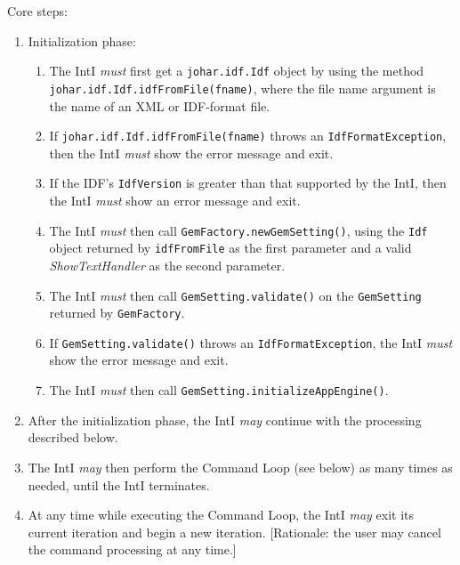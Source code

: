 \documentclass[11pt]{article}
\newcommand{\must}{{\it must}}
\newcommand{\may}{{\it may}}
\newcounter{coreReq}
\begin{document}
\noindent
Core steps:
\begin{enumerate}
\setcounter{enumi}{\value{coreReq}}
\item Initialization phase:
  \begin{enumerate}
  \item The IntI {\must} first get a {\tt johar.idf.Idf} object by using the
    method {\tt johar.idf.Idf.idfFromFile(fname)}, where the file name
    argument is the name of an XML or IDF-format file.
  \item If {\tt johar.idf.Idf.idfFromFile(fname)} throws an
    {\tt IdfFormatException}, then the IntI {\must} show the error message
    and exit.
  \item If the IDF's {\tt IdfVersion} is greater than that supported
    by the IntI, then the IntI {\must} show an error message
    and exit.
  \item The IntI {\must} then call {\tt GemFactory.newGemSetting()},
    using the {\tt Idf} object returned by {\tt idfFromFile} as the
    first parameter and a valid {\it ShowTextHandler} as the second
    parameter.
  \item The IntI {\must} then call {\tt GemSetting.validate()} on the
    {\tt GemSetting} returned by {\tt GemFactory}.
  \item If {\tt GemSetting.validate()} throws an
    {\tt IdfFormatException}, the IntI {\must} show the error message
    and exit.
  \item The IntI {\must} then call {\tt GemSetting.initializeAppEngine()}.
  \end{enumerate}
\item After the initialization phase, the IntI {\may}
  continue with the processing described below.
\item The IntI {\may} then perform the Command Loop
  (see below) as many times as needed, until the IntI terminates.
\item At any time while executing the Command Loop, the IntI
  {\may} exit its current iteration and begin a new iteration.
  [Rationale: the user may cancel the command processing at any time.]
\setcounter{coreReq}{\value{enumi}}
\end{enumerate}
\end{document}
